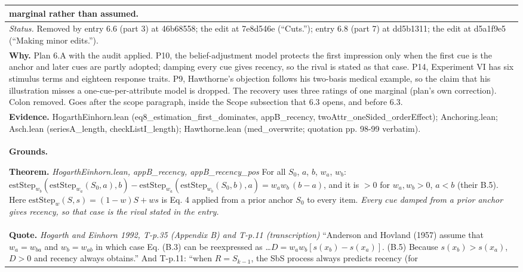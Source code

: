 \documentclass[10pt]{article}
\theoremstyle{definition}
\newlength{\fullw}\setlength{\fullw}{25.9cm}
\begin{document}
{\begin{longtable}{|p{0.9cm}|p{12.2cm}|p{12.2cm}|}
marginal rather than assumed. \\ \hline
\multicolumn{3}{|p{\fullw}|}{\textit{Status.} Removed by entry 6.6 (part 3) at 46b68558; the edit at 7e8d546e (``Cuts.''); entry 6.8 (part 7) at dd5b1311; the edit at d5a1f9e5 (``Making minor edits.'').} \\ \hline
\multicolumn{3}{|p{\fullw}|}{\textbf{Why.} Plan 6.A with the audit applied. P10, the belief-adjustment model protects the first impression only when the first cue is the anchor and later cues are partly adopted; damping every cue gives recency, so the rival is stated as that case. P14, Experiment VI has six stimulus terms and eighteen response traits. P9, Hawthorne's objection follows his two-basis medical example, so the claim that his illustration misses a one-cue-per-attribute model is dropped. The recovery uses three ratings of one marginal (plan's own correction). Colon removed. Goes after the scope paragraph, inside the Scope subsection that 6.3 opens, and before 6.3.} \\
\multicolumn{3}{|p{\fullw}|}{\textbf{Evidence.} HogarthEinhorn.lean (eq8\_estimation\_first\_dominates, appB\_recency, twoAttr\_oneSided\_orderEffect); Anchoring.lean; Asch.lean (seriesA\_length, checkListI\_length); Hawthorne.lean (med\_overwrite; quotation pp. 98-99 verbatim).} \\ \hline
\multicolumn{3}{|p{\fullw}|}{\textbf{Grounds.}\par \textbf{Theorem.} \textit{HogarthEinhorn.lean, appB\_recency, appB\_recency\_pos} \newline For all $S_0$, $a$, $b$, $w_a$, $w_b$:
$\mathrm{estStep}_{w_b}(\mathrm{estStep}_{w_a}(S_0,a),b)
 -\mathrm{estStep}_{w_a}(\mathrm{estStep}_{w_b}(S_0,b),a)=w_a w_b\,(b-a)$,
and it is $>0$ for $w_a,w_b>0$, $a<b$ (their B.5). Here
$\mathrm{estStep}_w(S,s)=(1-w)S+ws$ is Eq. 4 applied from a prior anchor $S_0$ to
every item. \newline \textit{Every cue damped from a prior anchor gives recency, so that case is the rival stated in the entry.}} \\
\multicolumn{3}{|p{\fullw}|}{\textbf{Quote.} \textit{Hogarth and Einhorn 1992, T-p.35 (Appendix B) and T-p.11 (transcription)} \newline ``Anderson and Hovland (1957) assume that $w_a = w_{ba}$ and $w_b = w_{ab}$ in
which case Eq. (B.3) can be reexpressed as \ldots $D = w_a w_b[s(x_b) - s(x_a)]$. (B.5)
Because $s(x_b) > s(x_a)$, $D > 0$ and recency always obtains.'' And T-p.11:
``when $R = S_{k-1}$, the SbS process always predicts recency (for
}
\end{longtable}}
\end{document}
